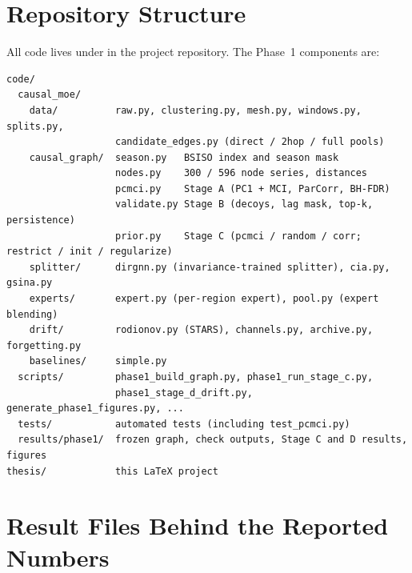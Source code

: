 \label{app:repro}

\section{Repository Structure}
\label{app:structure}

All code lives under  in the project repository. The Phase~1 components are:
\begin{lstlisting}
code/
  causal_moe/
    data/          raw.py, clustering.py, mesh.py, windows.py, splits.py,
                   candidate_edges.py (direct / 2hop / full pools)
    causal_graph/  season.py   BSISO index and season mask
                   nodes.py    300 / 596 node series, distances
                   pcmci.py    Stage A (PC1 + MCI, ParCorr, BH-FDR)
                   validate.py Stage B (decoys, lag mask, top-k, persistence)
                   prior.py    Stage C (pcmci / random / corr; restrict / init / regularize)
    splitter/      dirgnn.py (invariance-trained splitter), cia.py, gsina.py
    experts/       expert.py (per-region expert), pool.py (expert blending)
    drift/         rodionov.py (STARS), channels.py, archive.py, forgetting.py
    baselines/     simple.py
  scripts/         phase1_build_graph.py, phase1_run_stage_c.py,
                   phase1_stage_d_drift.py, generate_phase1_figures.py, ...
  tests/           automated tests (including test_pcmci.py)
  results/phase1/  frozen graph, check outputs, Stage C and D results, figures
thesis/            this LaTeX project
\end{lstlisting}

\section{Result Files Behind the Reported Numbers}
\label{app:resultmap}

